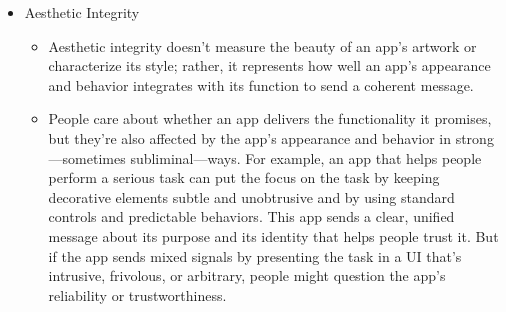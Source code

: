 \begin{itemize}
\item Aesthetic Integrity
	\begin{itemize}
	\item Aesthetic integrity doesn’t measure the beauty of an app’s artwork or characterize its style; rather, it represents how well an app’s appearance and behavior integrates with its function to send a coherent message. 
	\item People care about whether an app delivers the functionality it promises, but they’re also affected by the app’s appearance and behavior in strong—sometimes subliminal—ways. For example, an app that helps people perform a serious task can put the focus on the task by keeping decorative elements subtle and unobtrusive and by using standard controls and predictable behaviors. This app sends a clear, unified message about its purpose and its identity that helps people trust it. But if the app sends mixed signals by presenting the task in a UI that’s intrusive, frivolous, or arbitrary, people might question the app’s reliability or trustworthiness.


\end{itemize}
\end{itemize}
